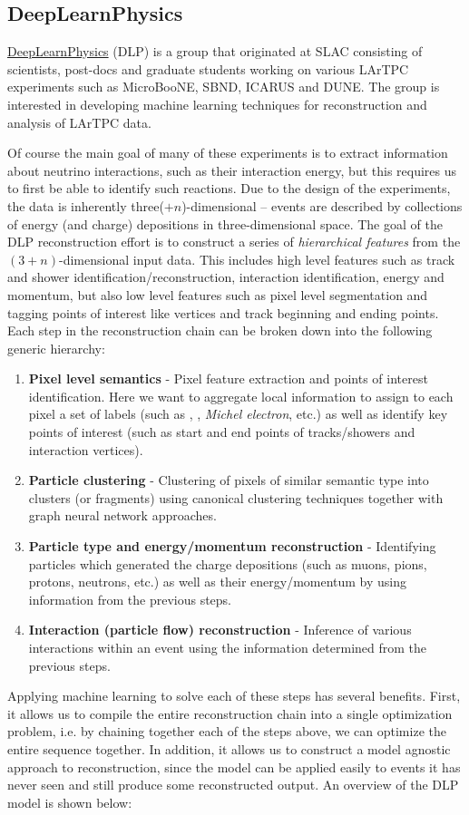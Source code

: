\documentclass[8pt]{refart}
\begin{document}
\subsection{DeepLearnPhysics}
\href{https://deeplearnphysics.org/}{DeepLearnPhysics} (DLP) \cite{DLP1,DLP2,DLP3} is a group that originated at SLAC consisting of scientists, post-docs and graduate students working on various LArTPC experiments such as MicroBooNE, SBND, ICARUS and DUNE.  The group is interested in developing machine learning techniques for reconstruction and analysis of LArTPC data.

Of course the main goal of many of these experiments is to extract information about neutrino interactions, such as their interaction energy, but this requires us to first be able to identify such reactions.  Due to the design of the experiments, the data is inherently three($+n$)-dimensional -- events are described by collections of energy (and charge) depositions in three-dimensional space.  The goal of the DLP reconstruction effort is to construct a series of \textit{hierarchical features} from the $(3+n)$-dimensional input data.  This includes high level features such as track and shower identification/reconstruction, interaction identification, energy and momentum, but also low level features such as pixel level segmentation and tagging points of interest like vertices and track beginning and ending points.  Each step in the reconstruction chain can be broken down into the following generic hierarchy:
\begin{enumerate}
    \item \textbf{Pixel level semantics} - Pixel feature extraction and points of interest identification.  Here we want to aggregate local information to assign to each pixel a set of labels (such as , , \textit{Michel electron}, etc.) as well as identify key points of interest (such as start and end points of tracks/showers and interaction vertices). 
    \item \textbf{Particle clustering} - Clustering of pixels of similar semantic type into clusters (or fragments) using canonical clustering techniques together with graph neural network approaches.
    \item \textbf{Particle type and energy/momentum reconstruction} - Identifying particles which generated the charge depositions (such as muons, pions, protons, neutrons, etc.) as well as their energy/momentum by using information from the previous steps.
    \item \textbf{Interaction (particle flow) reconstruction} - Inference of various interactions within an event using the information determined from the previous steps.
\end{enumerate}
Applying machine learning to solve each of these steps has several benefits.  First, it allows us to compile the entire reconstruction chain into a single optimization problem, i.e. by chaining together each of the steps above, we can optimize the entire sequence together.  In addition, it allows us to construct a model agnostic approach to reconstruction, since the model can be applied easily to events it has never seen and still produce some reconstructed output.  An overview of the DLP model is shown below:
\end{document}
